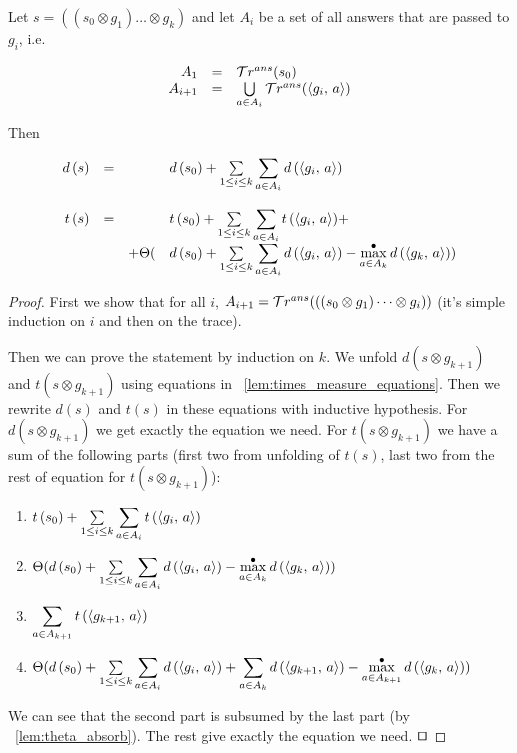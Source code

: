 \begin{lemma}
\label{lem:times_gen_measure_approximations}

Let $s = ((s_0 \otimes g_1) \dots \otimes g_k)$ and let $A_i$ be a set of all answers that are passed to $g_i$, i.e.

\[
\begin{array}{rcl}
A_1 &=& \mathcal{T}r^{ans}(s_0) \\
A_{i + 1} & = & \bigcup\limits_{a \in A_i} \mathcal{T}r^{ans}(\langle g_i ,\, a \rangle) 
\end{array}
\]

Then

\[
\begin{array}{rcrl}
d\,(s) &=& & d\,(s_0) + \sum\limits_{1 \le i \le k} \displaystyle\sum\limits_{a \in A_i} d\,(\langle g_i ,\, a \rangle) \\
\\
t\,(s) &=& & t\,(s_0) + \sum\limits_{1 \le i \le k} \displaystyle\sum\limits_{a \in A_i} t\,(\langle g_i ,\, a \rangle) + \\
& & + \Theta( & d\,(s_0) + \sum\limits_{1 \le i \le k} \displaystyle\sum\limits_{a \in A_i} d\,(\langle g_i ,\, a \rangle) - \max^{\bullet}\limits_{a \in A_k}  d\,(\langle g_k ,\, a \rangle)) \\
\end{array}
\]

\end{lemma}
\begin{proof}
First we show that for all $i$, $A_{i + 1} = \mathcal{T}r^{ans}(((s_0 \otimes g_1) \dots \otimes g_i))$ (it's simple induction on $i$ and then on the trace).

Then we can prove the statement by induction on $k$.
We unfold $d(s \otimes g_{k+1})$ and $t(s \otimes g_{k+1})$ using equations in \lemmaword~\ref{lem:times_measure_equations}.
Then we rewrite $d(s)$ and $t(s)$ in these equations with inductive hypothesis.
For $d(s \otimes g_{k+1})$ we get exactly the equation we need.
For $t(s \otimes g_{k+1})$ we have a sum of the following parts (first two from unfolding of $t(s)$, last two from the rest of equation for $t(s \otimes g_{k+1})$):
\begin{enumerate}
\item $t\,(s_0) + \sum\limits_{1 \le i \le k} \displaystyle\sum\limits_{a \in A_i} t\,(\langle g_i ,\, a \rangle)$
\item $ \Theta( d\,(s_0) + \sum\limits_{1 \le i \le k} \displaystyle\sum\limits_{a \in A_i} d\,(\langle g_i ,\, a \rangle) - \max^{\bullet}\limits_{a \in A_k}  d\,(\langle g_k ,\, a \rangle))$
\item $\displaystyle\sum\limits_{a \in A_{k+1}} t\,(\langle g_{k+1} ,\, a \rangle)$
\item $ \Theta( d\,(s_0) + \sum\limits_{1 \le i \le k} \displaystyle\sum\limits_{a \in A_i} d\,(\langle g_i ,\, a \rangle) + \displaystyle\sum\limits_{a \in A_k} d\,(\langle g_{k+1} ,\, a \rangle) - \max^{\bullet}\limits_{a \in A_{k + 1}}  d\,(\langle g_k ,\, a \rangle))$
\end{enumerate}

We can see that the second part is subsumed by the last part (by \lemmaword~\ref{lem:theta_absorb}). The rest give exactly the equation we need. $\qed$
\end{proof}

